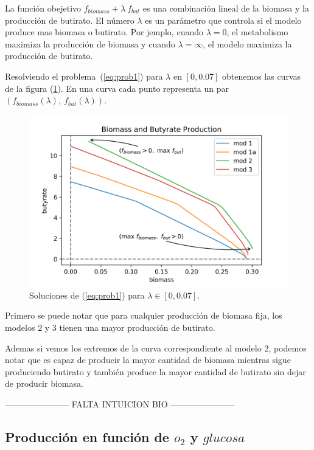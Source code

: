 \documentclass[12pt,spanish]{article}
\begin{document}
La función obejetivo $f_{biomass} +  \lambda \ f_{but}$  es una combinación lineal de la biomasa y la producción de butirato. El número $\lambda$ es un parámetro que controla si el modelo produce mas biomasa o butirato. Por jemplo, cuando $\lambda = 0$, el metabolismo maximiza la producción de biomasa y cuando $\lambda = \infty $, el modelo maximiza la producción de butirato.

\par

Resolviendo el problema~(\ref{eq:prob1}) para $\lambda$ en $[0, 0.07]$ obtenemos las curvas de la figura (\ref{fig:paretoCurve}). En una curva cada punto representa un par $(f_{biomass}(\lambda), \ f_{but}(\lambda))$.


\begin{figure}[h]\label{fig:paretoCurve}
  \includegraphics{../plots/lambdaAllModelsAnn.png}
  \caption{Soluciones de (\ref{eq:prob1}) para $\lambda \in [0, 0.07]$.}
\end{figure}

Primero se puede notar que para cualquier producción de biomasa fija, los modelos $2$ y $3$ tienen una mayor producción de butirato.

Ademas si vemos los extremos de la curva correspondiente al modelo $2$, podemos notar que es capaz de producir la mayor cantidad de biomasa mientras sigue produciendo butirato y también produce la mayor cantidad de butirato sin dejar de producir biomasa.

\begin{center}
  ----------------------- FALTA INTUICION BIO -----------------------
\end{center}

\subsection{Producción en función de $o_2$ y $glucosa$}
\end{document}
